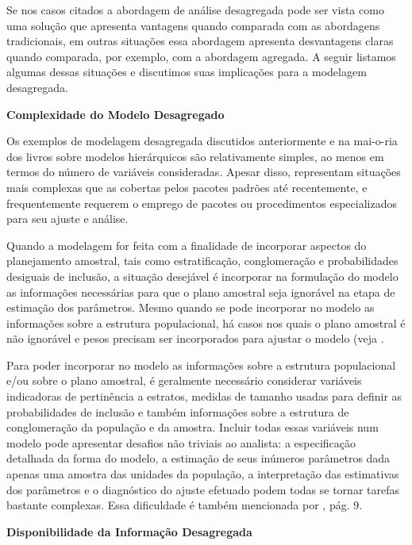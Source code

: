 \documentclass[]{book}
\numberwithin{example}{chapter}
\numberwithin{remark}{chapter}
\numberwithin{definition}{chapter}
\begin{document}
Se nos casos citados a abordagem de análise desagregada pode ser vista
como uma solução que apresenta vantagens quando comparada com as
abordagens tradicionais, em outras situações essa abordagem apresenta
desvantagens claras quando comparada, por exemplo, com a abordagem
agregada. A seguir listamos algumas dessas situações e discutimos suas
implicações para a modelagem desagregada.

\textbf{Complexidade do Modelo Desagregado}

Os exemplos de modelagem desagregada discutidos anteriormente e na
mai-o-ria dos livros sobre modelos hierárquicos são relativamente
simples, ao menos em termos do número de variáveis consideradas. Apesar
disso, representam situações mais complexas que as cobertas pelos
pacotes padrões até recentemente, e frequentemente requerem o emprego de
pacotes ou procedimentos especializados para seu ajuste e análise.

Quando a modelagem for feita com a finalidade de incorporar aspectos do
planejamento amostral, tais como estratificação, conglomeração e
probabilidades desiguais de inclusão, a situação desejável é incorporar
na formulação do modelo as informações necessárias para que o plano
amostral seja ignorável na etapa de estimação dos parâmetros. Mesmo
quando se pode incorporar no modelo as informações sobre a estrutura
populacional, há casos nos quais o plano amostral é não ignorável e
pesos precisam ser incorporados para ajustar o modelo (veja
\citep{Pfefetalli}.

Para poder incorporar no modelo as informações sobre a estrutura
populacional e/ou sobre o plano amostral, é geralmente necessário
considerar variáveis indicadoras de pertinência a estratos, medidas de
tamanho usadas para definir as probabilidades de inclusão e também
informações sobre a estrutura de conglomeração da população e da
amostra. Incluir todas essas variáveis num modelo pode apresentar
desafios não triviais ao analista: a especificação detalhada da forma do
modelo, a estimação de seus inúmeros parâmetros dada apenas uma amostra
das unidades da população, a interpretação das estimativas dos
parâmetros e o diagnóstico do ajuste efetuado podem todas se tornar
tarefas bastante complexas. Essa dificuldade é também mencionada por
\citep{Sk89a}, pág. 9.

\textbf{Disponibilidade da Informação Desagregada}
\end{document}
